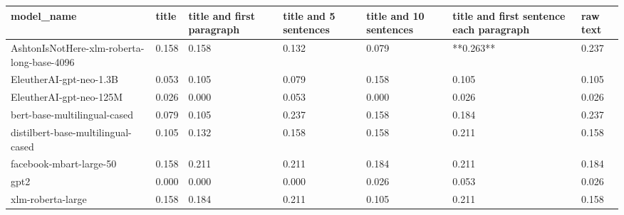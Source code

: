 \begin{tabular}{lllllll}
\toprule
                                model\_name & title & title and first paragraph & title and 5 sentences & title and 10 sentences & title and first sentence each paragraph & raw text \\
\midrule
AshtonIsNotHere-xlm-roberta-long-base-4096 & 0.158 &                     0.158 &                 0.132 &                  0.079 &                               **0.263** &    0.237 \\
                   EleutherAI-gpt-neo-1.3B & 0.053 &                     0.105 &                 0.079 &                  0.158 &                                   0.105 &    0.105 \\
                   EleutherAI-gpt-neo-125M & 0.026 &                     0.000 &                 0.053 &                  0.000 &                                   0.026 &    0.026 \\
              bert-base-multilingual-cased & 0.079 &                     0.105 &                 0.237 &                  0.158 &                                   0.184 &    0.237 \\
        distilbert-base-multilingual-cased & 0.105 &                     0.132 &                 0.158 &                  0.158 &                                   0.211 &    0.158 \\
                   facebook-mbart-large-50 & 0.158 &                     0.211 &                 0.211 &                  0.184 &                                   0.211 &    0.184 \\
                                      gpt2 & 0.000 &                     0.000 &                 0.000 &                  0.026 &                                   0.053 &    0.026 \\
                         xlm-roberta-large & 0.158 &                     0.184 &                 0.211 &                  0.105 &                                   0.211 &    0.158 \\
\bottomrule
\end{tabular}
